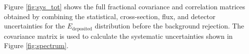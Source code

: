 Figure \ref{fig:sys_tot} shows the full fractional covariance and correlation matrices obtained by combining the statistical, cross-section, flux, and detector uncertainties for the $E_{\mathrm{deposited}}$ distribution before the background rejection. The covariance matrix is used to calculate the systematic uncertainties shown in Figure \ref{fig:spectrum}. 

